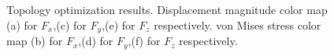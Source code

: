 \begin{figure}[hbt!]
{                                                     }
                                                   
     \caption{Topology optimization results.  Displacement magnitude color map (a) for $F_x$,(c) for $F_y$,(e) for $F_z$ respectively.
     von Mises stress color map (b) for $F_x$,(d) for $F_y$,(f) for $F_z$ respectively. \label{fig.2.28}} 
 \end{figure}
 \clearpage
